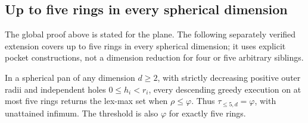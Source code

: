 \subsection{Up to five rings in every spherical dimension}\label{sec:fivedim}

The global proof above is stated for the plane. The following separately
verified extension covers up to five rings in every spherical dimension;
it uses explicit pocket constructions, not a dimension reduction for
four or five arbitrary siblings.

\begin{theorem}\label{thm:five-dim}
In a spherical pan of any dimension $d\ge2$, with strictly decreasing
positive outer radii and independent holes $0\le h_i<r_i$, every
descending greedy execution on at most five rings returns the lex-max
set when $\rho\le\varphi$. Thus $\tau_{\le5,d}=\varphi$, with
unattained infimum. The threshold is also $\varphi$ for exactly five rings.
\end{theorem}

